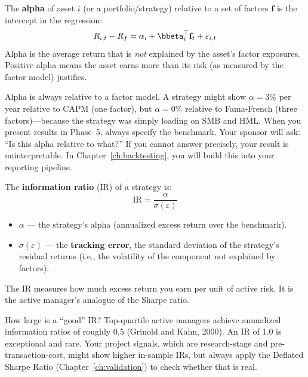 \begin{definition}[Alpha]
The \textbf{alpha} of asset $i$ (or a portfolio/strategy) relative to a set of factors $\mathbf{f}$ is the intercept in the regression:
\begin{equation}
R_{i,t} - R_f = \alpha_i + \bbeta_i^\top \mathbf{f}_t + \varepsilon_{i,t}
\label{eq:alpha}
\end{equation}
Alpha is the average return that is \emph{not} explained by the asset's factor exposures. Positive alpha means the asset earns more than its risk (as measured by the factor model) justifies.
\end{definition}

\begin{warning}
Alpha is always relative to a factor model. A strategy might show $\alpha = 3\%$ per year relative to CAPM (one factor), but $\alpha = 0\%$ relative to Fama-French (three factors)---because the strategy was simply loading on SMB and HML. When you present results in Phase~5, always specify the benchmark. Your sponsor will ask: ``Is this alpha relative to what?'' If you cannot answer precisely, your result is uninterpretable. In Chapter~\ref{ch:backtesting}, you will build this into your reporting pipeline.
\end{warning}

\begin{definition}
The \textbf{information ratio} (IR) of a strategy is:
\begin{equation}
\text{IR} = \frac{\alpha}{\sigma(\varepsilon)}
\label{eq:ir}
\end{equation}
\begin{itemize}[nosep]
  \item $\alpha$ --- the strategy's alpha (annualized excess return over the benchmark).
  \item $\sigma(\varepsilon)$ --- the \textbf{tracking error}, the standard deviation of the strategy's residual returns (i.e., the volatility of the component not explained by factors).
\end{itemize}
The IR measures how much excess return you earn per unit of active risk. It is the active manager's analogue of the Sharpe ratio.
\end{definition}

How large is a ``good'' IR? Top-quartile active managers achieve annualized information ratios of roughly 0.5 (Grinold and Kahn, 2000). An IR of 1.0 is exceptional and rare. Your project signals, which are research-stage and pre-transaction-cost, might show higher in-sample IRs, but always apply the Deflated Sharpe Ratio (Chapter~\ref{ch:validation}) to check whether that is real.

